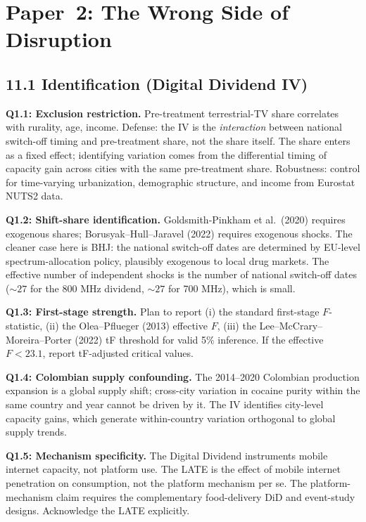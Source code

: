 \documentclass[11pt,a4paper]{article}
\begin{document}
\section{Paper~2: The Wrong Side of Disruption}

\subsection*{11.1 Identification (Digital Dividend IV)}

\textbf{Q1.1: Exclusion restriction.} Pre-treatment terrestrial-TV share correlates with rurality, age, income. Defense: the IV is the \emph{interaction} between national switch-off timing and pre-treatment share, not the share itself. The share enters as a fixed effect; identifying variation comes from the differential timing of capacity gain across cities with the same pre-treatment share. Robustness: control for time-varying urbanization, demographic structure, and income from Eurostat NUTS2 data.

\textbf{Q1.2: Shift-share identification.} Goldsmith-Pinkham et al.\ (2020) requires exogenous shares; Borusyak--Hull--Jaravel (2022) requires exogenous shocks. The cleaner case here is BHJ: the national switch-off dates are determined by EU-level spectrum-allocation policy, plausibly exogenous to local drug markets. The effective number of independent shocks is the number of national switch-off dates ($\sim 27$ for the 800 MHz dividend, $\sim 27$ for 700 MHz), which is small.

\textbf{Q1.3: First-stage strength.} Plan to report (i) the standard first-stage $F$-statistic, (ii) the Olea--Pflueger (2013) effective $F$, (iii) the Lee--McCrary--Moreira--Porter (2022) tF threshold for valid 5\% inference. If the effective $F < 23.1$, report tF-adjusted critical values.

\textbf{Q1.4: Colombian supply confounding.} The 2014--2020 Colombian production expansion is a global supply shift; cross-city variation in cocaine purity within the same country and year cannot be driven by it. The IV identifies city-level capacity gains, which generate within-country variation orthogonal to global supply trends.

\textbf{Q1.5: Mechanism specificity.} The Digital Dividend instruments mobile internet capacity, not platform use. The LATE is the effect of mobile internet penetration on consumption, not the platform mechanism per se. The platform-mechanism claim requires the complementary food-delivery DiD and event-study designs. Acknowledge the LATE explicitly.
\end{document}
